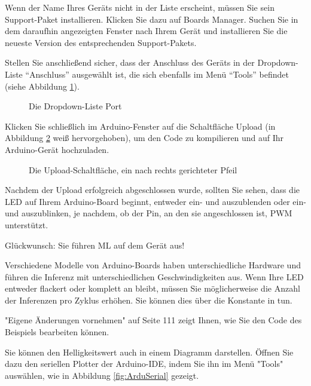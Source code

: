 Wenn der Name Ihres Geräts nicht in der Liste erscheint, müssen Sie sein Support-Paket installieren. Klicken Sie dazu auf Boards Manager. Suchen Sie in dem daraufhin angezeigten Fenster nach Ihrem Gerät und installieren Sie die neueste Version des entsprechenden Support-Pakets.

Stellen Sie anschließend sicher, dass der Anschluss des Geräts in der Dropdown-Liste ``Anschluss'' ausgewählt ist, die sich ebenfalls im Menü ``Tools'' befindet (siehe Abbildung  \ref{fig:ArduSelectPort}).

\begin{figure}
    \centering
    
    \caption{Die Dropdown-Liste Port}\label{fig:ArduSelectPort}
\end{figure} 


Klicken Sie schließlich im Arduino-Fenster auf die Schaltfläche Upload (in Abbildung \ref{fig:ArduUpload} weiß hervorgehoben), um den Code zu kompilieren und auf Ihr Arduino-Gerät hochzuladen.

\begin{figure}
    \centering
    
    \caption{Die Upload-Schaltfläche, ein nach rechts gerichteter Pfeil}\label{fig:ArduUpload}
\end{figure} 


Nachdem der Upload erfolgreich abgeschlossen wurde, sollten Sie sehen, dass die LED auf Ihrem Arduino-Board beginnt, entweder ein- und auszublenden oder ein- und auszublinken, je nachdem, ob der Pin, an den sie angeschlossen ist, PWM unterstützt.

\medskip

Glückwunsch: Sie führen ML auf dem Gerät aus!

\medskip


Verschiedene Modelle von Arduino-Boards haben unterschiedliche Hardware und führen die Inferenz mit unterschiedlichen Geschwindigkeiten aus. Wenn Ihre LED entweder flackert oder komplett an bleibt, müssen Sie möglicherweise die Anzahl der Inferenzen pro Zyklus erhöhen. Sie können dies über die Konstante  in  tun.



 	"Eigene Änderungen vornehmen" auf Seite 111 zeigt Ihnen, wie Sie den Code des Beispiels bearbeiten können.


Sie können den Helligkeitswert auch in einem Diagramm darstellen. Öffnen Sie dazu den seriellen Plotter der Arduino-IDE, indem Sie ihn im Menü "Tools" auswählen, wie in Abbildung \ref{fig:ArduSerial} gezeigt.

